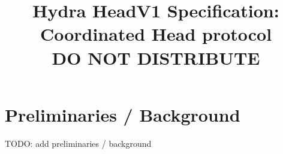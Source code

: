 \documentclass[11pt]{article}
\begin{document}
\date{}

\title{\Large \textbf{Hydra HeadV1 Specification: Coordinated Head protocol}\\[2ex] DO NOT DISTRIBUTE}
\author{}

\maketitle



\section{Preliminaries / Background}
TODO: add preliminaries / background








\end{document}
